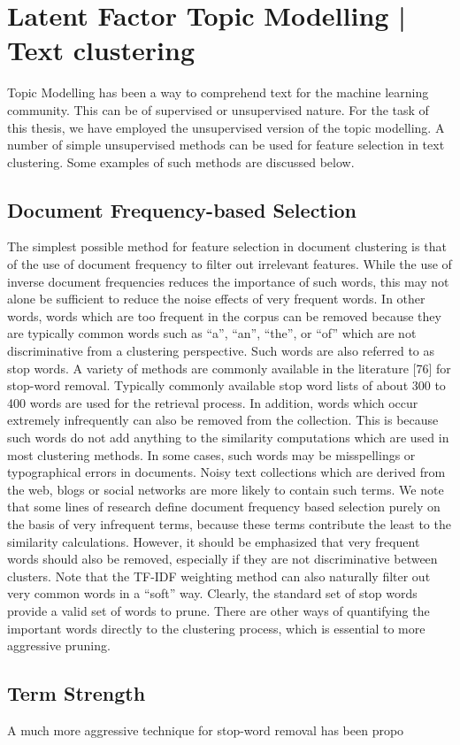 \chapter{Latent Factor Topic Modelling | Text clustering}

Topic Modelling has been a way to comprehend text for the machine learning community. This can be of supervised or unsupervised nature. For the task of this thesis, we have employed the unsupervised version of the topic modelling. A number of simple unsupervised methods can be used for feature selection in text clustering. Some examples of such methods are discussed below.

\section{Document Frequency-based Selection}
The simplest possible method for feature selection in document clustering is that of the use of document frequency to filter out irrelevant features. While the use of inverse document frequencies reduces the importance of such words, this may not alone be sufficient to reduce the noise effects of very frequent words. In other words, words which are too frequent in the corpus can be removed because they are typically common words such as “a”, “an”, “the”, or “of” which are not discriminative from a clustering perspective. Such words are also referred to as stop words.
A variety of methods are commonly available in the literature [76] for stop-word removal.  Typically commonly available stop word lists of
about 300 to 400 words are used for the retrieval process. In addition,
words which occur extremely infrequently can also be removed from
the collection. This is because such words do not add anything to the
similarity computations which are used in most clustering methods. In some cases, such words may be misspellings or typographical errors in
documents. Noisy text collections which are derived from the web, blogs
or social networks are more likely to contain such terms. We note that
some lines of research define document frequency based selection purely
on the basis of very infrequent terms, because these terms contribute the
least to the similarity calculations. However, it should be emphasized
that very frequent words should also be removed, especially if they are
not discriminative between clusters. Note that the TF-IDF weighting
method can also naturally filter out very common words in a “soft” way.
Clearly, the standard set of stop words provide a valid set of words to
prune. There are other ways of quantifying the important words directly to the clustering process, which is essential to more aggressive pruning.

\section{Term Strength}
A much more aggressive technique for stop-word removal has been propo





